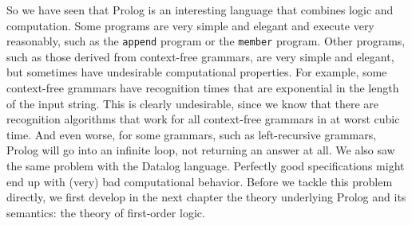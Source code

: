 So we have seen that Prolog is an interesting language that combines
logic and computation.  Some programs are very simple and elegant and
execute very reasonably, such as the \verb|append| program or the
\verb|member| program.  Other programs, such as those derived from
context-free grammars, are very simple and elegant, but sometimes have
undesirable computational properties.  For example, some context-free
grammars have recognition times that are exponential in the length of
the input string.  This is clearly undesirable, since we know that
there are recognition algorithms that work for all context-free
grammars in at worst cubic time.  And even worse, for some grammars,
such as left-recursive grammars, Prolog will go into an infinite loop,
not returning an answer at all.  We also saw the same problem with the
Datalog language.  Perfectly good specifications might end up with
(very) bad computational behavior.  Before we tackle this problem
directly, we first develop in the next chapter the theory underlying
Prolog and its semantics: the theory of first-order logic.

